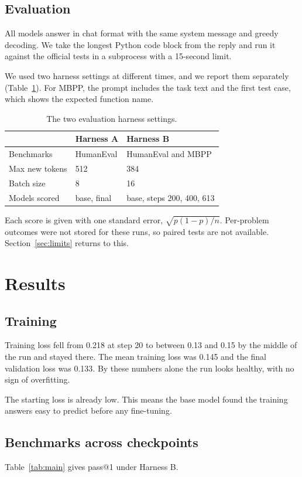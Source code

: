 \documentclass[11pt,a4paper]{article}
\begin{document}
\subsection{Evaluation}
All models answer in chat format with the same system message and greedy decoding. We take the longest Python code block from the reply and run it against the official tests in a subprocess with a 15-second limit.

We used two harness settings at different times, and we report them separately (Table~\ref{tab:harness}). For MBPP, the prompt includes the task text and the first test case, which shows the expected function name.

\begin{table}[h]
\centering
\begin{tabular}{lll}
\toprule
 & Harness A & Harness B \\
\midrule
Benchmarks & HumanEval & HumanEval and MBPP \\
Max new tokens & 512 & 384 \\
Batch size & 8 & 16 \\
Models scored & base, final & base, steps 200, 400, 613 \\
\bottomrule
\end{tabular}
\caption{The two evaluation harness settings.}
\label{tab:harness}
\end{table}

Each score is given with one standard error, $\sqrt{p(1-p)/n}$. Per-problem outcomes were not stored for these runs, so paired tests are not available. Section~\ref{sec:limits} returns to this.

\section{Results}
\subsection{Training}
Training loss fell from 0.218 at step 20 to between 0.13 and 0.15 by the middle of the run and stayed there. The mean training loss was 0.145 and the final validation loss was 0.133. By these numbers alone the run looks healthy, with no sign of overfitting.

The starting loss is already low. This means the base model found the training answers easy to predict before any fine-tuning.

\subsection{Benchmarks across checkpoints}
Table~\ref{tab:main} gives pass@1 under Harness B.
\end{document}
